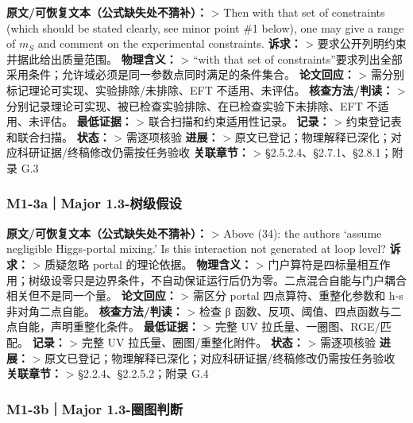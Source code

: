 \documentclass[
]{article}
\begin{document}
\textbf{原文/可恢复文本（公式缺失处不猜补）：} \textgreater{} Then with
that set of constraints (which should be stated clearly, see minor point
\#1 below), one may give a range of \(m_S\) and comment on the
experimental constraints. \textbf{诉求：} \textgreater{}
要求公开列明约束并据此给出质量范围。 \textbf{物理含义：} \textgreater{}
``with that set of
constraints''要求列出全部采用条件；允许域必须是同一参数点同时满足的条件集合。
\textbf{论文回应：} \textgreater{}
需分别标记理论可实现、实验排除/未排除、EFT 不适用、未评估。
\textbf{核查方法/判读：} \textgreater{}
分别记录理论可实现、被已检查实验排除、在已检查实验下未排除、EFT
不适用、未评估。 \textbf{最低证据：} \textgreater{}
联合扫描和约束适用性记录。 \textbf{记录：} \textgreater{}
约束登记表和联合扫描。 \textbf{状态：} \textgreater{} 需逐项核验
\textbf{进展：} \textgreater{}
原文已登记；物理解释已深化；对应科研证据/终稿修改仍需按任务验收
\textbf{关联章节：} \textgreater{} §2.5.2.4、§2.7.1、§2.8.1；附录 G.3

\subsubsection{M1-3a｜Major
1.3-树级假设}\label{m1-3amajor-1.3-ux6811ux7ea7ux5047ux8bbe}

\textbf{原文/可恢复文本（公式缺失处不猜补）：} \textgreater{} Above
(34): the authors `assume negligible Higgs-portal mixing.' Is this
interaction not generated at loop level? \textbf{诉求：} \textgreater{}
质疑忽略 portal 的理论依据。 \textbf{物理含义：} \textgreater{}
门户算符是四标量相互作用；树级设零只是边界条件，不自动保证运行后仍为零。二点混合自能与门户耦合相关但不是同一个量。
\textbf{论文回应：} \textgreater{} 需区分 portal 四点算符、重整化参数和
h-s 非对角二点自能。 \textbf{核查方法/判读：} \textgreater{} 检查 β
函数、反项、阈值、四点函数与二点自能，声明重整化条件。
\textbf{最低证据：} \textgreater{} 完整 UV 拉氏量、一圈图、RGE/匹配。
\textbf{记录：} \textgreater{} 完整 UV 拉氏量、圈图/重整化附件。
\textbf{状态：} \textgreater{} 需逐项核验 \textbf{进展：} \textgreater{}
原文已登记；物理解释已深化；对应科研证据/终稿修改仍需按任务验收
\textbf{关联章节：} \textgreater{} §2.2.4、§2.2.5.2；附录 G.4

\subsubsection{M1-3b｜Major
1.3-圈图判断}\label{m1-3bmajor-1.3-ux5708ux56feux5224ux65ad}
\end{document}
